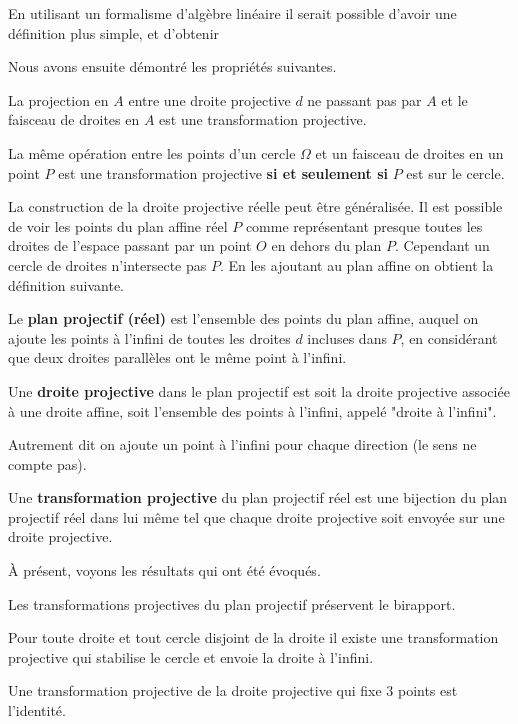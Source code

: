 En utilisant un formalisme d'algèbre linéaire il serait possible d'avoir une définition plus simple, et d'obtenir

Nous avons ensuite démontré les propriétés suivantes.

\begin{pro}
La projection en $A$ entre une droite projective $d$ ne passant pas par $A$ et le faisceau de droites en $A$ est une transformation projective.

\smallskip

La même opération entre les points d'un cercle $\Omega$ et un faisceau de droites en un point $P$ est une transformation projective \textbf{si et seulement si} $P$ est sur le cercle.
\end{pro}
\medskip

La construction de la droite projective réelle peut être généralisée. Il est possible de voir les points du plan affine réel $P$ comme représentant presque toutes les droites de l'espace passant par un point $O$ en dehors du plan $P$. Cependant un cercle de droites n'intersecte pas $P$. En les ajoutant au plan affine on obtient la définition suivante.

\begin{dfn}

Le \textbf{plan projectif (réel)} est l'ensemble des points du plan affine, auquel on ajoute les points à l'infini de toutes les droites $d$ incluses dans $P$, en considérant que deux droites parallèles ont le même point à l'infini.

\medskip

Une \textbf{droite projective} dans le plan projectif est soit la droite projective associée à une droite affine, soit l'ensemble des points à l'infini, appelé "droite à l'infini".

\end{dfn}

Autrement dit on ajoute un point à l'infini pour chaque direction (le sens ne compte pas).

\begin{dfn}
Une \textbf{transformation projective} du plan projectif réel est une bijection du plan projectif réel dans lui même tel que chaque droite projective soit envoyée sur une droite projective.
\end{dfn}

À présent, voyons les résultats qui ont été évoqués.

\begin{pro}
Les transformations projectives du plan projectif préservent le birapport.

\medskip

Pour toute droite et tout cercle disjoint de la droite il existe une transformation projective qui stabilise le cercle et envoie la droite à l'infini.

\medskip

Une transformation projective de la droite projective qui fixe $3$ points est l'identité.
\end{pro}

